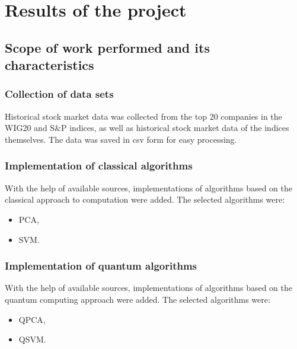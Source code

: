 


\section{Results of the project}

\subsection{Scope of work performed and its characteristics}

\subsubsection{Collection of data sets}
Historical stock market data was collected from the top 20 companies in the WIG20 and S\&P indices, as well as historical stock market data of the indices themselves.
The data was saved in csv form for easy processing.

\subsubsection{Implementation of classical algorithms}
With the help of available sources, implementations of algorithms based on the classical approach to computation were added. 
The selected algorithms were:
\begin{itemize}
	\item PCA,
	\item SVM.
\end{itemize}
\subsubsection{Implementation of quantum algorithms}
With the help of available sources, implementations of algorithms based on the quantum computing approach were added. 
The selected algorithms were:
\begin{itemize}
	\item QPCA,
	\item QSVM.
\end{itemize}
